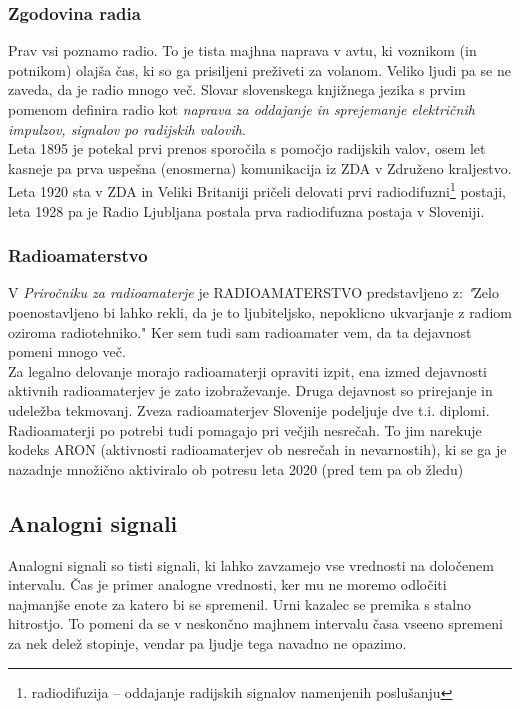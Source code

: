 \documentclass[12pt]{article}
\begin{document}
        \subsubsection{Zgodovina radia}
            Prav vsi poznamo radio. To je tista majhna naprava v avtu, ki voznikom (in potnikom) olajša čas, ki so ga prisiljeni preživeti za volanom. 
            Veliko ljudi pa se ne zaveda, da je radio mnogo več. Slovar slovenskega knjižnega jezika s prvim pomenom definira radio kot \textit{naprava za oddajanje in sprejemanje električnih impulzov, signalov po radijskih valovih}. \cite{SSKJ-radio}\\
            Leta 1895 \cite{ppt} je potekal prvi prenos sporočila s pomočjo radijskih valov, osem let kasneje pa prva uspešna (enosmerna) komunikacija iz ZDA v Združeno kraljestvo. 
            Leta 1920 sta v ZDA in Veliki Britaniji pričeli delovati prvi radiodifuzni\footnote{radiodifuzija – oddajanje radijskih signalov namenjenih poslušanju} postaji, leta 1928 pa je Radio Ljubljana postala prva radiodifuzna postaja v Sloveniji.
        \subsubsection{Radioamaterstvo}
            V \textit{Priročniku za radioamaterje} je RADIOAMATERSTVO predstavljeno z: \textit{"}Zelo poenostavljeno bi lahko rekli, da je to ljubiteljsko, nepoklicno ukvarjanje z radiom oziroma radiotehniko." \cite{HAM-prirocnik}
            Ker sem tudi sam radioamater vem, da ta dejavnost pomeni mnogo več. \\
            Za legalno delovanje morajo radioamaterji opraviti izpit, ena izmed dejavnosti aktivnih radioamaterjev je zato izobraževanje.
            Druga dejavnost so prirejanje in udeležba tekmovanj. Zveza radioamaterjev Slovenije podeljuje dve t.i. diplomi.\\
            Radioamaterji po potrebi tudi pomagajo pri večjih nesrečah. To jim narekuje kodeks ARON (aktivnosti radioamaterjev ob nesrečah in nevarnostih), ki se ga je nazadnje množično aktiviralo ob potresu leta 2020 (pred tem pa ob žledu)
    \subsection{Analogni signali}
            Analogni signali so tisti signali, ki lahko zavzamejo vse vrednosti na določenem intervalu. Čas je primer analogne vrednosti, ker mu ne moremo odločiti najmanjše enote za katero bi se spremenil. Urni kazalec se premika s stalno hitrostjo. To pomeni da se v neskončno majhnem intervalu časa vseeno spremeni za nek delež stopinje, vendar pa ljudje tega navadno ne opazimo. 
\end{document}
